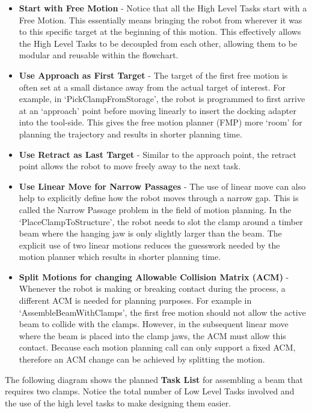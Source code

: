 \documentclass[11pt]{book}
\begin{document}
\begin{itemize}
	\item \textbf{Start with Free Motion} - Notice that all the High Level Tasks start with a Free Motion. This essentially means bringing the robot from wherever it was to this specific target at the beginning of this motion. This effectively allows the High Level Tasks to be decoupled from each other, allowing them to be modular and reusable within the flowchart.

	\item \textbf{Use Approach as First Target} - The target of the first free motion is often set at a small distance away from the actual target of interest. For example, in ‘PickClampFromStorage’, the robot is programmed to first arrive at an ‘approach’ point before moving linearly to insert the docking adapter into the tool-side. This gives the free motion planner (FMP) more ‘room’ for planning the trajectory and results in shorter planning time.

	\item \textbf{Use Retract as Last Target} - Similar to the approach point, the retract point allows the robot to move freely away to the next task.

	\item \textbf{Use Linear Move for Narrow Passages} - The use of linear move can also help to explicitly define how the robot moves through a narrow gap. This is called the Narrow Passage problem in the field of motion planning. In the ‘PlaceClampToStructure’, the robot needs to slot the clamp around a timber beam where the hanging jaw is only slightly larger than the beam. The explicit use of two linear motions reduces the guesswork needed by the motion planner which results in shorter planning time.

	\item \textbf{Split Motions for changing Allowable Collision Matrix (ACM)} - Whenever the robot is making or breaking contact during the process, a different ACM is needed for planning purposes. For example in ‘AssembleBeamWithClamps’, the first free motion should not allow the active beam to collide with the clamps. However, in the subsequent linear move where the beam is placed into the clamp jaws, the ACM must allow this contact. Because each motion planning call can only support a fixed ACM, therefore an ACM change can be achieved by splitting the motion.

\end{itemize}
The following diagram shows the planned \textbf{Task List} for assembling a beam that requires two clamps. Notice the total number of Low Level Tasks involved and the use of the high level tasks to make designing them easier.
\end{document}
